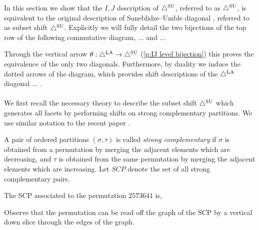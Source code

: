 


In this section we show that the $I,J$ description of $\triangle^{\mathrm{SU}}$, referred to as $\triangle^{\mathrm{SU}}$, is equivalent to the original description of Saneblidze--Umble diagonal \cite{SaneblidzeUmble04}, referred to as subset shift $\triangle^{\mathrm{SU}}$. Explicitly we will fully detail the two bijections of the top row of the following commutative diagram, ... and ...
\begin{center}
\end{center}
Through the vertical arrow $\theta:\triangle^{\mathrm{LA}} \to \triangle^{\mathrm{SU}}$ (\cref{p:IJ level bijection}) this proves the equivalence of the only two diagonals.
Furthermore, by duality we induce the dotted arrows of the diagram, which provides shift descriptions of the $\triangle^{\mathrm{LA}}$ diagonal ... .
\\\\
We first recall the necessary theory to describe the subset shift $\triangle^{\mathrm{SU}}$ which generates all facets by performing shifts on strong complementary partitions. We use similar notation to the recent paper \cite{saneblidzeComparingDiagonalsAssociahedra2022}.
\begin{definition}
A pair of ordered partitions $(\sigma,\tau)$ is called \emph{strong complementary} if $\sigma$ is obtained from a permutation by merging the adjacent elements which are decreasing, and $\tau$ is obtained from the same permutation by merging the adjacent elements which are increasing.
Let $SCP$ denote the set of all strong complementary pairs.
\end{definition}

\begin{example}\label{ex:strong-complementary}
The SCP associated to the permutation $2573641$ is,
\begin{center}
\end{center}
Observe that the permutation can be read off the graph of the SCP by a vertical down slice through the edges of the graph.
\end{example}

